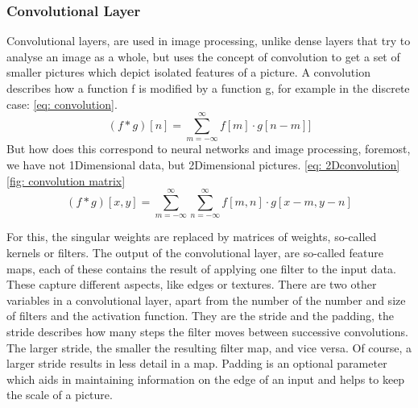 \subsubsection{Convolutional Layer}
Convolutional layers, are used in image processing\cite{lecun_backpropagation_1989,szegedy_going_2014,krizhevsky_imagenet_2012}, unlike dense layers that try to analyse an image as a whole, but uses the concept of convolution to get a set of smaller pictures which depict isolated features of a picture.
A convolution describes how a function f is modified by a function g, for example in the discrete case: \ref{eq: convolution}.
\begin{equation}
(f \ast g)[n]
    = \sum_{m=-\infty}^{\infty}f[m]\cdot g[n - m]
    \label{eq: convolution}]
\end{equation}
But how does this correspond to neural networks and image processing, foremost, we have not 1Dimensional data, but 2Dimensional pictures. \ref{eq: 2Dconvolution} \ref{fig: convolution matrix}
\begin{equation}
(f \ast g)[x,y]
    = \sum^{\infty}_{m=-\infty} \sum^{\infty}_{n=-\infty} f[m,n]\cdot g[x-m,y-n]
    \label{eq: 2Dconvolution}
\end{equation}

For this, the singular weights are replaced by matrices of weights, so-called kernels or filters.
The output of the convolutional layer, are so-called feature maps, each of these contains the result of applying one filter to the input data.
These capture different aspects, like edges or textures.
There are two other variables in a convolutional layer, apart from the number of the number and size of filters and the activation function.
They are the stride and the padding, the stride describes how many steps the filter moves between successive convolutions.
The larger stride, the smaller the resulting filter map, and vice versa.
Of course, a larger stride results in less detail in a map.
Padding is an optional parameter which aids in maintaining information on the edge of an input and helps to keep the scale of a picture.


